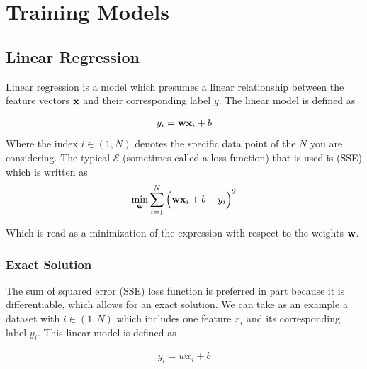 \section{Training Models}


\subsection{Linear Regression}
Linear regression is a model which presumes a linear relationship between the feature vectors $\textbf{x}$ and their corresponding label $y$. The linear model is defined as

\begin{align}
    y_i = \textbf{wx}_i +b
\end{align}
Where the index $i\in(1,N)$ denotes the specific data point of the $N$ you are considering. The typical  $\mathcal{E}$ (sometimes called a loss function) that is used is  (SSE) which is written as
\begin{align}
    	\min_{\textbf{w}}\sum_{i=1}^N\Big(\textbf{wx}_i +b - y_i\Big)^2
\end{align}

Which is read as a minimization of the expression with respect to the weights $\textbf{w}$. 


\subsubsection{Exact Solution}\label{lin-reg-exact}
The sum of squared error (SSE) loss function is preferred in part because it is differentiable, which allows for an exact solution. We can take as an example a dataset with $i\in(1,N)$ which includes one feature $x_i$ and its corresponding label $y_i$. This linear model is defined as

\begin{align}
y_i = wx_i + b
\end{align}

